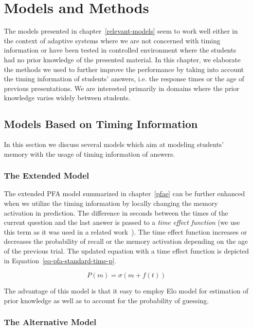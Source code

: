\chapter{Models and Methods}

The models presented in chapter~\ref{relevant-models} seem to work well either in the context of adaptive systems where we are not concerned with timing information or have been tested in controlled environment where the students had no prior knowledge of the presented material. In this chapter, we elaborate the methods we used to further improve the performance by taking into account the timing information of students' answers, i.e. the response times or the age of previous presentations. We are interested primarily in domains where the prior knowledge varies widely between students.

\section{Models Based on Timing Information}

In this section we discuss several models which aim at modeling students' memory with the usage of timing information of answers.

\subsection{The Extended Model}
\label{pfaet}

The extended PFA model summarized in chapter~\ref{pfae} can be further enhanced when we utilize the timing information by locally changing the memory activation in prediction. The difference in seconds between the times of the current question and the last answer is passed to a \textit{time effect function} (we use this term as it was used in a related work~\cite{Pelanek2015}). The time effect function increases or decreases the probability of recall or the memory activation depending on the age of the previous trial. The updated equation with a time effect function is depicted in Equation~\ref{eq-pfa-standard-time-p}.

\begin{equation} \label{eq-pfa-standard-time-p}
  P(m) = \sigma(m + f(t))
\end{equation}

The advantage of this model is that it easy to employ Elo model for estimation of prior knowledge as well as to account for the probability of guessing.

\subsection{The Alternative Model}
\label{pfagt}

